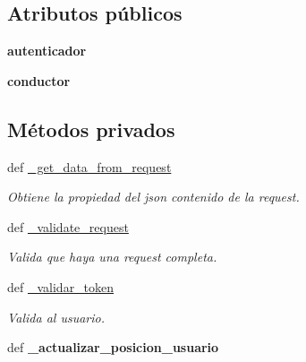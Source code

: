 \subsection*{Atributos públicos}
\begin{DoxyCompactItemize}
\item 
\hypertarget{classsrc_1_1resources_1_1usuario_modificar_posicion_1_1_usuario_modificar_posicion_a45af22de264a650894690011ae1a1489}{{\bfseries autenticador}}\label{classsrc_1_1resources_1_1usuario_modificar_posicion_1_1_usuario_modificar_posicion_a45af22de264a650894690011ae1a1489}

\item 
\hypertarget{classsrc_1_1resources_1_1usuario_modificar_posicion_1_1_usuario_modificar_posicion_a1c7ca6ef7824dc880ad3a5103ec6566e}{{\bfseries conductor}}\label{classsrc_1_1resources_1_1usuario_modificar_posicion_1_1_usuario_modificar_posicion_a1c7ca6ef7824dc880ad3a5103ec6566e}

\end{DoxyCompactItemize}
\subsection*{Métodos privados}
\begin{DoxyCompactItemize}
\item 
def \hyperlink{classsrc_1_1resources_1_1usuario_modificar_posicion_1_1_usuario_modificar_posicion_aae13c7944d856a343f6125fd2e4421c4}{\-\_\-get\-\_\-data\-\_\-from\-\_\-request}
\begin{DoxyCompactList}\small\item\em Obtiene la propiedad del json contenido de la request. \end{DoxyCompactList}\item 
def \hyperlink{classsrc_1_1resources_1_1usuario_modificar_posicion_1_1_usuario_modificar_posicion_a54d77c4941b97883c98d55b1cddc5930}{\-\_\-validate\-\_\-request}
\begin{DoxyCompactList}\small\item\em Valida que haya una request completa. \end{DoxyCompactList}\item 
def \hyperlink{classsrc_1_1resources_1_1usuario_modificar_posicion_1_1_usuario_modificar_posicion_a4e9232f8e1f36581c5bac7a79c825f76}{\-\_\-validar\-\_\-token}
\begin{DoxyCompactList}\small\item\em Valida al usuario. \end{DoxyCompactList}\item 
\hypertarget{classsrc_1_1resources_1_1usuario_modificar_posicion_1_1_usuario_modificar_posicion_ae6aa1e259bed2ae4e47f89c3ee86a28d}{def {\bfseries \-\_\-actualizar\-\_\-posicion\-\_\-usuario}}\label{classsrc_1_1resources_1_1usuario_modificar_posicion_1_1_usuario_modificar_posicion_ae6aa1e259bed2ae4e47f89c3ee86a28d}

\end{DoxyCompactItemize}


